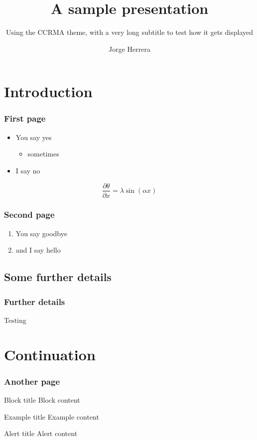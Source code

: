 \documentclass{beamer}
\title{A sample presentation}
\subtitle{Using the CCRMA theme, with a very long subtitle to test how it gets displayed}
\author{Jorge Herrera}
\date
\begin{document}
\begin{frame}[plain]
\titlepage
\end{frame}
\addtocounter{framenumber}{-1}  %


\begin{frame}[plain]
    \tableofcontents
\end{frame}

\section[Intro]{Introduction}
\begin{frame}[plain]
    \tableofcontents[currentsection]
\end{frame}

\begin{frame}\frametitle{First page}
    \begin{itemize}
    \item You say yes
        \begin{itemize}
        \item sometimes
        \end{itemize}
    \item I say no
    \end{itemize}

    \begin{equation}
    \frac{\partial \theta}{\partial x} = \lambda \sin(\alpha x)
    \end{equation}

\end{frame}

\begin{frame}\frametitle{Second page}
    \begin{enumerate}
    \item You say goodbye
    \item and I say hello
    \end{enumerate}
\end{frame}

\subsection[SubIntro]{Some further details}
\begin{frame}\frametitle{Further details}
Testing
\end{frame}


\section[Cont]{Continuation}
\begin{frame}[plain]
    \tableofcontents[currentsection]
\end{frame}

\begin{frame}\frametitle{Another page}

    \begin{block}{Block title}
    Block content
    \end{block}

    \begin{example}{Example title}
    Example content
    \end{example}

    \begin{alertblock}{Alert title}
    Alert content
    \end{alertblock}

\end{frame}
\end{document}

